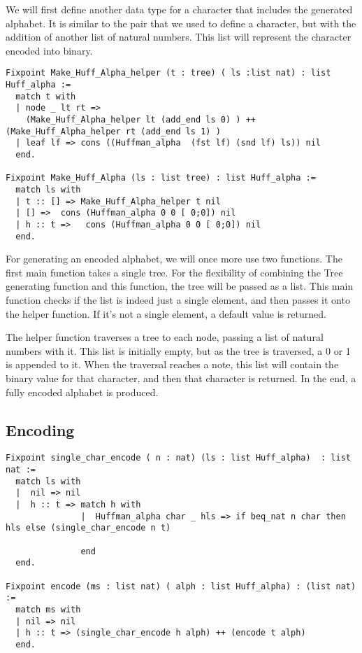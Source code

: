 \documentclass{llncs}
\begin{document}
We will first define another data type for a character that includes the generated alphabet. It is similar to the pair that we used to define a character, but with the addition of another list of natural numbers. This list will represent the character encoded into binary.

\newpage

\begin{lstlisting}
Fixpoint Make_Huff_Alpha_helper (t : tree) ( ls :list nat) : list Huff_alpha :=
  match t with
  | node _ lt rt =>
    (Make_Huff_Alpha_helper lt (add_end ls 0) ) ++  (Make_Huff_Alpha_helper rt (add_end ls 1) )
  | leaf lf => cons ((Huffman_alpha  (fst lf) (snd lf) ls)) nil
  end.
  
Fixpoint Make_Huff_Alpha (ls : list tree) : list Huff_alpha :=
  match ls with
  | t :: [] => Make_Huff_Alpha_helper t nil
  | [] =>  cons (Huffman_alpha 0 0 [ 0;0]) nil
  | h :: t =>   cons (Huffman_alpha 0 0 [ 0;0]) nil
  end.
\end{lstlisting}

For generating an encoded alphabet, we will once more use two functions. The first main function takes a single tree. For the flexibility of combining the Tree generating function and this function, the tree will be passed as a list. This main function checks if the list is indeed just a single element, and then passes it onto the helper function. If it’s not a single element, a default value is returned. 

The helper function traverses a tree to each node, passing a list of natural numbers with it. This list is initially empty, but as the tree is traversed, a 0 or 1 is appended to it. When the traversal reaches a note, this list will contain the binary value for  that character, and then that character is returned. In the end, a fully encoded alphabet is produced. 


\subsection{Encoding}

\begin{lstlisting}
Fixpoint single_char_encode ( n : nat) (ls : list Huff_alpha)  : list nat :=
  match ls with
  |  nil => nil
  |  h :: t => match h with
               |  Huffman_alpha char _ hls => if beq_nat n char then hls else (single_char_encode n t)
         
               end
  end.

Fixpoint encode (ms : list nat) ( alph : list Huff_alpha) : (list nat)  :=
  match ms with
  | nil => nil
  | h :: t => (single_char_encode h alph) ++ (encode t alph)
  end.
\end{lstlisting}
\end{document}
